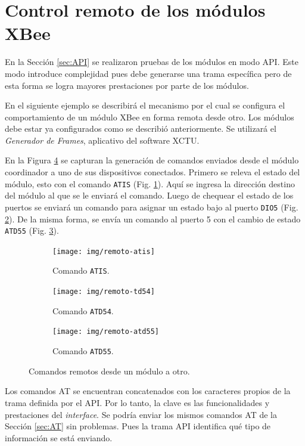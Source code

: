 \documentclass[11pt,oneside,spanish,a4paper]{article}
\begin{document}
\section[Control Remoto]{Control remoto de los módulos XBee}
\label{sec:remoto}

En la Sección \ref{sec:API} se realizaron pruebas de los módulos en modo
API. Este modo introduce complejidad pues debe generarse una trama
específica pero de esta forma se logra mayores prestaciones por parte
de los módulos. 

En el siguiente ejemplo se describirá el mecanismo por el cual se
configura el comportamiento de un módulo XBee en forma remota desde
otro. Los módulos debe estar ya configurados como se describió
anteriormente. Se utilizará el \emph{Generador de Frames}, aplicativo
del software XCTU. 

En la Figura \ref{fig:remotos-dio5} se capturan la generación de
comandos enviados desde el módulo coordinador a uno de sus
dispositivos conectados. Primero se releva el estado del módulo, esto
con el comando \texttt{ATIS} (Fig. \ref{fig:remoto-atis}). Aquí se
ingresa la dirección destino del módulo al que se le enviará el
comando. Luego de chequear el estado de los puertos se enviará un
comando para asignar un estado bajo al puerto \texttt{DIO5}
(Fig. \ref{fig:remoto-atd54}). De la misma forma, se envía un comando
al puerto 5 con el cambio de estado \texttt{ATD55}
(Fig. \ref{fig:remoto-atd55}).

\begin{figure}[h]
  \centering
  \begin{subfigure}{0.3\textwidth}
    \centering
    \texttt{[image: img/remoto-atis]}
    \caption{Comando \texttt{ATIS}.}
    \label{fig:remoto-atis}
  \end{subfigure}
  \hfill
  \begin{subfigure}{0.3\textwidth}
    \centering
    \texttt{[image: img/remoto-td54]}
    \caption{Comando \texttt{ATD54}.}
    \label{fig:remoto-atd54}
  \end{subfigure}
  \hfill
  \begin{subfigure}{0.3\textwidth}
    \centering
    \texttt{[image: img/remoto-atd55]}
    \caption{Comando \texttt{ATD55}.}
    \label{fig:remoto-atd55}
  \end{subfigure}
  \caption{Comandos remotos desde un módulo a otro.}
  \label{fig:remotos-dio5}
\end{figure}

Los comandos AT se encuentran concatenados con los caracteres propios
de la trama definida por el API. Por lo tanto, la clave es las
funcionalidades y prestaciones del \textsl{interface}. Se podría enviar los
mismos comandos AT de la Sección \ref{sec:AT} sin problemas. Pues la
trama API identifica qué tipo de información se está enviando.
\end{document}
